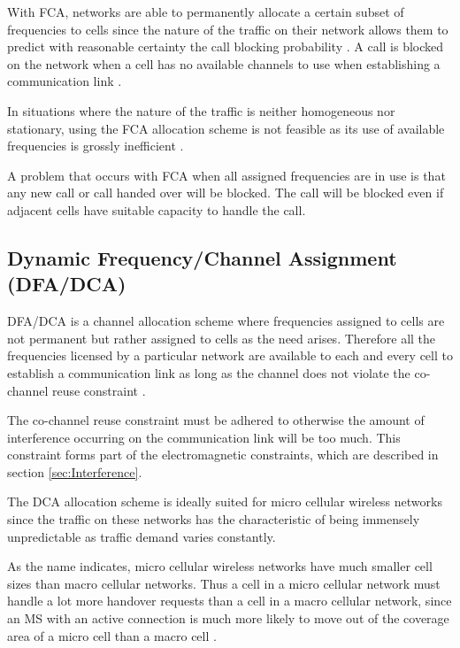 With FCA, networks are able to permanently allocate a certain subset of frequencies to cells since the nature of the traffic on their network allows them to predict with reasonable certainty the call blocking probability \cite{PrinciplesMobileCommunication}. A call is blocked on the network when a cell has no available channels to use when establishing a communication link \cite{PrinciplesMobileCommunication}.

In situations where the nature of the traffic is neither homogeneous nor stationary, using the FCA allocation scheme is not feasible as its use of available frequencies is grossly inefficient \cite{PrinciplesMobileCommunication}.

A problem that occurs with FCA when all assigned frequencies are in use is that any new call or call handed over will be blocked\cite{PrinciplesMobileCommunication}. The call will be blocked even if adjacent cells have suitable capacity to handle the call\cite{PrinciplesMobileCommunication}.

\subsection{Dynamic Frequency/Channel Assignment (DFA/DCA)}
DFA/DCA is a channel allocation scheme where frequencies assigned to cells are not permanent but rather assigned to cells as the need arises\cite{PrinciplesMobileCommunication}. Therefore all the frequencies licensed by a particular network are available to each and every cell to establish a communication link as long as the channel does not violate the co-channel reuse constraint \cite{PrinciplesMobileCommunication}. 

The co-channel reuse constraint must be adhered to otherwise the amount of interference occurring on the communication link will be too much. This constraint forms part of the electromagnetic constraints, which are described in section \ref{sec:Interference}.

The DCA allocation scheme is ideally suited for micro cellular wireless networks since the traffic on these networks has the characteristic of being immensely unpredictable as traffic demand varies constantly\cite{PrinciplesMobileCommunication,WirelessCommunications,MobileWirelessCommunications}.

As the name indicates, micro cellular wireless networks have much smaller cell sizes than macro cellular networks. Thus a cell in a micro cellular network must handle a lot more handover requests than a cell in a macro cellular network, since an MS with an active connection is much more likely to move out of the coverage area of a micro cell than a macro cell \cite{PrinciplesMobileCommunication,WirelessCommunications,MobileWirelessCommunications}.

